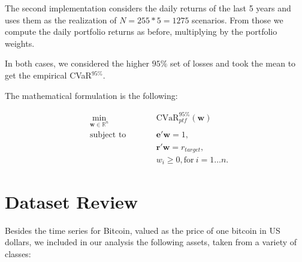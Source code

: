 \documentclass[12pt]{elsarticle}
\begin{document}
The second implementation considers the daily returns of the last 5 years and uses them as the realization of $N= 255 * 5 = 1275$ scenarios. From those we compute the daily portfolio returns as before, multiplying by the portfolio weights.

In both cases, we considered the higher $95\%$ set of losses and took the mean to get the empirical CVaR$^{95\%}$.

The mathematical formulation is the following:


\begin{subequations}
\begin{align}
&\!\min_{\mathbf{w}\in \mathbb{R}^{n}}        &\qquad& \text{CVaR}^{95\%}_{ptf}(\mathbf{w}) \\
& \text{subject to} &      & \mathbf{e}'\mathbf{w} = 1 ,\label{eq:constraint1}\\
&                  &      & \mathbf{r}'\mathbf{w} = r_{target},\label{eq:constraint2}\\
&		 &        & w_{i} \geq 0, \text{for} \: i = 1\dots n.
\end{align}
\end{subequations}




\section{Dataset Review}


Besides the time series for Bitcoin, valued as the price of one bitcoin in US dollars, we included in our analysis the following assets, taken from a variety of classes:
\end{document}
